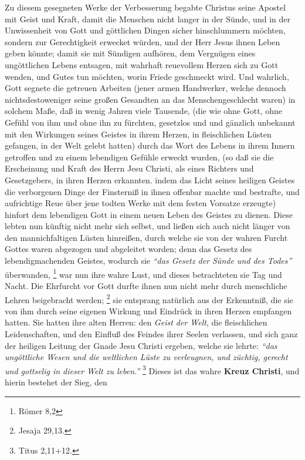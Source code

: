 Zu diesem gesegneten Werke der Verbesserung begabte Christus seine Apostel mit
Geist und Kraft, damit die Menschen nicht langer in der Sünde, und in der
Unwissenheit von Gott und göttlichen Dingen sicher hinschlummern möchten,
sondern zur Gerechtigkeit erwecket würden, und der Herr Jesus ihnen Leben geben
könnte; damit sie mit Sündigen aufhören, dem Vergnügen eines ungöttlichen Lebens
entsagen, mit wahrhaft reuevollem Herzen sich zu Gott wenden, und Gutes tun
möchten, worin Friede geschmeckt wird. Und wahrlich, Gott segnete die getreuen
Arbeiten (jener armen Handwerker, welche dennoch nichtsdestoweniger seine
großen Gesandten an das Menschengeschlecht waren) in solchem Maße, daß in
wenig Jahren viele Tausende, (die wie ohne Gott, ohne Gefühl von ihm und ohne
ihn
zu fürchten, gesetzlos und und gänzlich unbekannt mit den Wirkungen seines
Geistes in ihrem Herzen, in fleischlichen Lüsten gefangen, in der Welt gelebt
hatten) durch das Wort des Lebens in ihrem Innern getroffen und zu einem
lebendigen Gefühle erweckt wurden, (so daß sie die Erscheinung und Kraft des
Herrn Jesu Christi, als eines Richters und Gesetzgebers, in ihren Herzen
erkannten. indem das Licht seines heiligen Geistes die verborgenen Dinge der
Finsterniß in ihnen offenbar machte und bestrafte, und aufrichtige Reue über
jene todten Werke mit dem festen Vorsatze erzeugte) hinfort dem lebendigen Gott
in einem neuen Leben des Geistes zu dienen. Diese lebten nun künftig nicht mehr
sich selbst, und ließen sich auch nicht länger von den mannichfaltigen Lüsten
hinreißen, durch welche sie von der wahren Furcht Gottes waren abgezogen und
abgeleitet worden; denn das Gesetz des lebendigmachenden Geistes, wodurch sie
\textit{"`das Gesetz der Sünde und des Todes"'} überwanden,
\footnote{Römer 8,2}
 war nun
ihre wahre Lust, und dieses betrachteten sie Tag und Nacht. Die Ehrfurcht vor
Gott durfte ihnen nun nicht mehr durch menschliche Lehren beigebracht werden;
\footnote{Jesaja 29,13.}  sie entsprang
natürlich aus der Erkenntniß, die sie von
ihm durch seine eigenen Wirkung und Eindrück in ihren Herzen empfangen
hatten. Sie hatten ihre alten Herren: den \textit{Geist der Welt}, die
fleischlichen
Leidenschaften, und den Einfluß des Feindes ihrer Seelen verlassen, und sich
ganz der heiligen Leitung der Gnade Jesu Christi ergeben, welche sie lehrte:
\textit{"`das ungöttliche Wesen und die weltlichen Lüste zu verleugnen, und
züchtig, gerecht und gottselig in dieser Welt zu leben."'}
\footnote{Titus 2,11+12.}
Dieses ist das wahre \textbf{Kreuz Christi}, und hierin bestehet der Sieg, den
